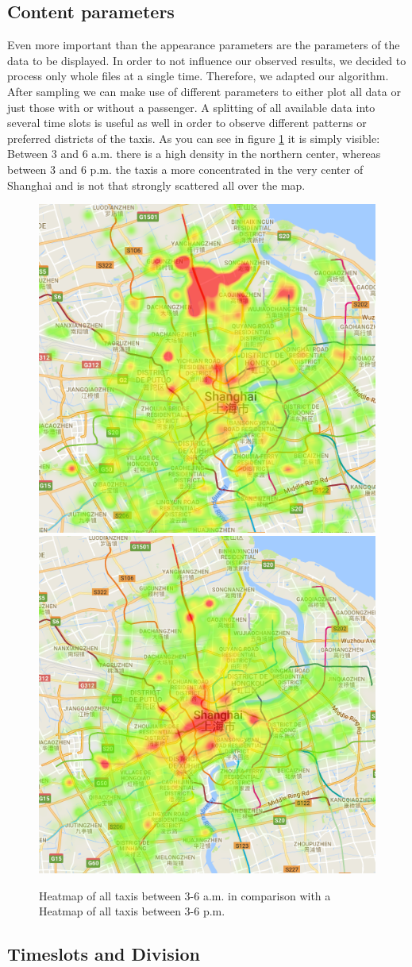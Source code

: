 \documentclass[11pt,conference,a4paper,twocolumns,romanappendices]{IEEEtran}
\begin{document}
\subsection{Content parameters}
Even more important than the appearance parameters are the parameters of the data to be displayed.
In order to not influence our observed results, we decided to process only whole files at a single time. Therefore, we adapted our algorithm.
After sampling we can make use of different parameters to either plot all data or just those with or without a passenger.
A splitting of all available data into several time slots is useful as well in order to observe different patterns or preferred districts of the taxis.
As you can see in figure \ref{fig:allPass 3h-6h and 15h-18h} it is simply visible: Between 3 and 6 a.m. there is a high density in the northern center, whereas between 3 and 6 p.m. the taxis a more concentrated in the very center of Shanghai and is not that strongly scattered all over the map.

\begin{figure}
\begin{center}
\includegraphics[width=.3\textwidth]{3to6.png}
\includegraphics[width=.3\textwidth]{15to18.png}
\end{center}
\caption{\label{fig:allPass 3h-6h and 15h-18h}Heatmap of all taxis between 3-6 a.m. in comparison with a Heatmap of all taxis between 3-6 p.m.}
\end{figure}

\subsection{Timeslots and Division}
\end{document}
